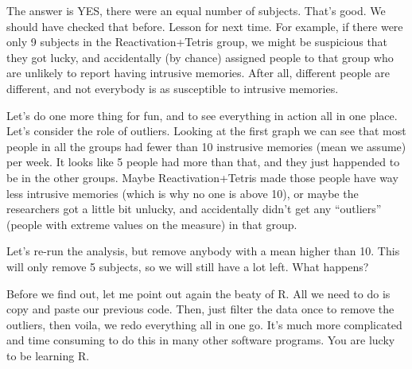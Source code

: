 \documentclass[]{book}
\theoremstyle{definition}
\theoremstyle{definition}
\theoremstyle{definition}
\theoremstyle{remark}
\begin{document}
The answer is YES, there were an equal number of subjects. That's good.
We should have checked that before. Lesson for next time. For example,
if there were only 9 subjects in the Reactivation+Tetris group, we might
be suspicious that they got lucky, and accidentally (by chance) assigned
people to that group who are unlikely to report having intrusive
memories. After all, different people are different, and not everybody
is as susceptible to intrusive memories.

Let's do one more thing for fun, and to see everything in action all in
one place. Let's consider the role of outliers. Looking at the first
graph we can see that most people in all the groups had fewer than 10
instrusive memories (mean we assume) per week. It looks like 5 people
had more than that, and they just happended to be in the other groups.
Maybe Reactivation+Tetris made those people have way less intrusive
memories (which is why no one is above 10), or maybe the researchers got
a little bit unlucky, and accidentally didn't get any ``outliers''
(people with extreme values on the measure) in that group.

Let's re-run the analysis, but remove anybody with a mean higher than
10. This will only remove 5 subjects, so we will still have a lot left.
What happens?

Before we find out, let me point out again the beaty of R. All we need
to do is copy and paste our previous code. Then, just filter the data
once to remove the outliers, then voila, we redo everything all in one
go. It's much more complicated and time consuming to do this in many
other software programs. You are lucky to be learning R.
\end{document}
